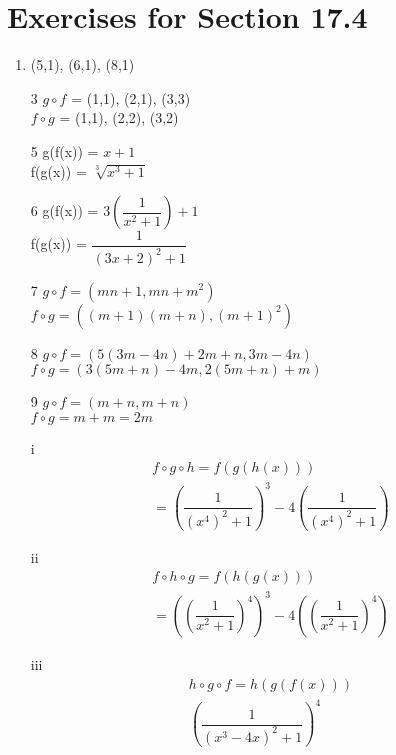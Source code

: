\documentclass[12pt]{article}
\begin{document}
\section*{Exercises for Section 17.4}
\begin{enumerate}
    \item {(5,1), (6,1), (8,1)}
    \item [3] $g\circ f$ = {(1,1), (2,1), (3,3)}\\
    $f\circ g$ = {(1,1), (2,2), (3,2)}\\
	\item [5] g(f(x)) = $x+1$\\
	    f(g(x)) = $\sqrt[3]{x^3 + 1}$
	\item [6] g(f(x)) = $3(\dfrac{1}{x^2 + 1})+1$\\
	    f(g(x)) = $\dfrac{1}{(3x+2)^2 + 1}$
	\item [7] $g\circ f = (mn + 1,mn + m^2)$\\
    $f\circ g = ((m+1)(m+n), (m+1)^2)$\\
	\item [8] $g\circ f = (5(3m-4n)+2m+n,3m-4n)$\\
    $f\circ g = (3(5m+n)-4m,2(5m+n)+m)$\\
	\item [9] $g\circ f = (m+n,m+n)$\\
    $f\circ g = m+m = 2m$\\
\end{enumerate}
\begin{enumerate}
    \item [i]
	\begin{equation*}
		\begin{split}
			f\circ g \circ h = f(g(h(x)))\\
			= (\dfrac{1}{(x^4)^2 + 1})^3 -4(\dfrac{1}{(x^4)^2 + 1})
		\end{split}
	\end{equation*}
    \item [ii]
	\begin{equation*}
		\begin{split}
			f\circ h \circ g = f(h(g(x)))\\
			= ((\dfrac{1}{x^2 + 1})^4)^3 -4((\dfrac{1}{x^2 + 1})^4)
		\end{split}
	\end{equation*}
    \item [iii]
	\begin{equation*}
		\begin{split}
			h\circ g \circ f = h(g(f(x)))\\
			(\dfrac{1}{(x^3 -4x)^2 + 1})^4
		\end{split}
	\end{equation*}
\end{enumerate}
\end{document}
